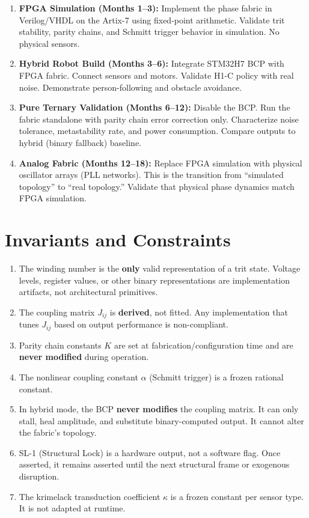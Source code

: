 \documentclass[11pt, a4paper]{article}
\begin{document}
\begin{enumerate}[label=\textbf{Phase \arabic*:}]
  \item \textbf{FPGA Simulation (Months 1--3):} Implement the phase fabric
        in Verilog/VHDL on the Artix-7 using fixed-point arithmetic. Validate
        trit stability, parity chains, and Schmitt trigger behavior in
        simulation. No physical sensors.
  \item \textbf{Hybrid Robot Build (Months 3--6):} Integrate STM32H7 BCP
        with FPGA fabric. Connect sensors and motors. Validate H1-C policy
        with real noise. Demonstrate person-following and obstacle avoidance.
  \item \textbf{Pure Ternary Validation (Months 6--12):} Disable the BCP.
        Run the fabric standalone with parity chain error correction only.
        Characterize noise tolerance, metastability rate, and power consumption.
        Compare outputs to hybrid (binary fallback) baseline.
  \item \textbf{Analog Fabric (Months 12--18):} Replace FPGA simulation with
        physical oscillator arrays (PLL networks). This is the transition
        from ``simulated topology'' to ``real topology.'' Validate that
        physical phase dynamics match FPGA simulation.
\end{enumerate}

\section{Invariants and Constraints}

\begin{enumerate}
  \item The winding number is the \textbf{only} valid representation of a
        trit state. Voltage levels, register values, or other binary
        representations are implementation artifacts, not architectural
        primitives.
  \item The coupling matrix $J_{ij}$ is \textbf{derived}, not fitted. Any
        implementation that tunes $J_{ij}$ based on output performance is
        non-compliant.
  \item Parity chain constants $K$ are set at fabrication/configuration
        time and are \textbf{never modified} during operation.
  \item The nonlinear coupling constant $\alpha$ (Schmitt trigger) is a
        frozen rational constant.
  \item In hybrid mode, the BCP \textbf{never modifies} the coupling matrix.
        It can only stall, heal amplitude, and substitute binary-computed
        output. It cannot alter the fabric's topology.
  \item SL-1 (Structural Lock) is a hardware output, not a software flag.
        Once asserted, it remains asserted until the next structural frame
        or exogenous disruption.
  \item The krimelack transduction coefficient $\kappa$ is a frozen constant
        per sensor type. It is not adapted at runtime.
\end{enumerate}
\end{document}
